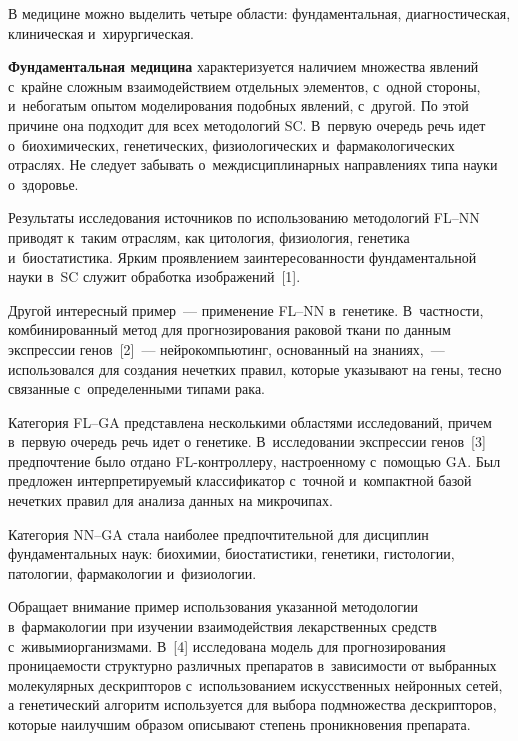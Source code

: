 \begin{multicols}{2}
     В медицине можно выделить четыре области: фундаментальная, 
диагностическая, клиническая и~хирургическая.
     
     \textbf{Фундаментальная медицина} характеризуется наличием 
множества явлений с~крайне сложным взаимодействием отдельных элементов, 
с~одной стороны, и~небогатым опытом моделирования подобных явлений, 
с~другой. По этой причине она подходит для всех методологий SC. В~первую 
очередь речь идет о~биохимических, генетических, физиологических 
и~фармакологических отраслях. Не следует забывать о~междисциплинарных 
направлениях типа науки о~здоровье.
     
     Результаты исследования источников по использованию методологий  
FL--NN приводят к~таким отраслям, как цитология, физиология, генетика 
и~биостатистика. Ярким проявлением \mbox{заинтересованности} фундаментальной 
науки в~SC служит обработка изображений~[1].
     
     Другой интересный пример~--- применение FL--NN в~генетике. 
В~частности, комбинированный метод для прогнозирования раковой ткани по 
данным экспрессии генов~[2]~--- нейрокомпьютинг, основанный на  
знаниях,~--- использовался для создания нечетких правил, которые указывают 
на гены, тесно связанные с~определенными типами рака.
     
     Категория FL--GA представлена несколькими областями исследований, 
причем в~первую очередь речь идет о генетике. В~исследовании экспрессии 
генов~[3] предпочтение было отдано FL-конт\-рол\-ле\-ру, настроенному 
с~помощью GA. Был предложен интерпретируемый классификатор с~точной 
и~компактной базой нечетких правил для анализа данных на микрочипах.
     
     Категория NN--GA стала наиболее предпочтительной для дисциплин 
фундаментальных наук: биохимии, биостатистики, генетики, гистологии, 
патологии, фармакологии и~физиологии.
     
     Обращает внимание пример использования указанной методологии 
в~фармакологии при изучении взаимодействия лекарственных средств 
с~живыми\linebreak организмами. В~[4] исследована модель для прогнозирования 
проницаемости структурно различных препаратов в~зависимости от выбранных 
\mbox{молекулярных} дескрипторов с~использованием искусственных нейронных 
сетей, а генетический алгоритм используется для выбора подмножества\linebreak 
дескрипторов, которые наилучшим образом описывают степень проникновения 
препарата.
     

\end{multicols}
